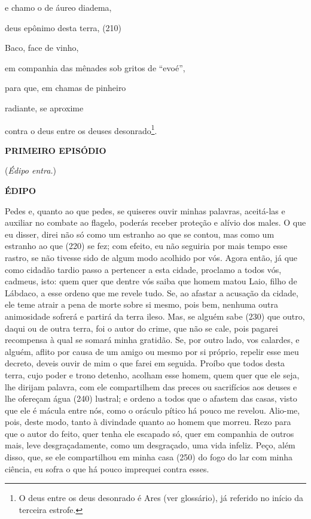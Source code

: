 e chamo o de áureo diadema,

deus epônimo desta terra, (210)

Baco, face de vinho,

em companhia das mênades sob gritos de ``evoé'',

para que, em chamas de pinheiro

radiante, se aproxime

contra o deus entre os deuses desonrado\footnote{O deus entre os deus
  desonrado é Ares (ver glossário), já referido no início da terceira
  estrofe.}.

\textbf{PRIMEIRO EPISÓDIO}

(\emph{Édipo entra.})

\textbf{ÉDIPO}

Pedes e, quanto ao que pedes, se quiseres ouvir minhas palavras,
aceitá-las e auxiliar no combate ao flagelo, poderás receber proteção e
alívio dos males. O que eu disser, direi não só como um estranho ao que
se contou, mas como um estranho ao que (220) se fez; com efeito, eu não
seguiria por mais tempo esse rastro, se não tivesse sido de algum modo
acolhido por vós. Agora então, já que como cidadão tardio passo a
pertencer a esta cidade, proclamo a todos vós, cadmeus, isto: quem quer
que dentre vós saiba que homem matou Laio, filho de Lábdaco, a esse
ordeno que me revele tudo. Se, ao afastar a acusação da cidade, ele teme
atrair a pena de morte sobre si mesmo, pois bem, nenhuma outra
animosidade sofrerá e partirá da terra ileso. Mas, se alguém sabe (230)
que outro, daqui ou de outra terra, foi o autor do crime, que não se
cale, pois pagarei recompensa à qual se somará minha gratidão. Se, por
outro lado, vos calardes, e alguém, aflito por causa de um amigo ou
mesmo por si próprio, repelir esse meu decreto, deveis ouvir de mim o
que farei em seguida. Proíbo que todos desta terra, cujo poder e trono
detenho, acolham esse homem, quem quer que ele seja, lhe dirijam
palavra, com ele compartilhem das preces ou sacrifícios aos deuses e lhe
ofereçam água (240) lustral; e ordeno a todos que o afastem das casas,
visto que ele é mácula entre nós, como o oráculo pítico há pouco me
revelou. Alio-me, pois, deste modo, tanto à divindade quanto ao homem
que morreu. Rezo para que o autor do feito, quer tenha ele escapado só,
quer em companhia de outros mais, leve desgraçadamente, como um
desgraçado, uma vida infeliz. Peço, além disso, que, se ele compartilhou
em minha casa (250) do fogo do lar com minha ciência, eu sofra o que há
pouco imprequei contra esses.

